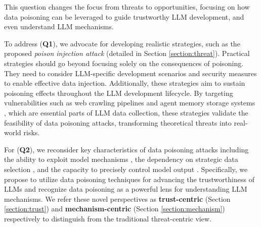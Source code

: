 This question changes the focus from threats to opportunities, focusing on how data poisoning can be leveraged to guide trustworthy LLM development, and even understand LLM mechanisms.


To address (\textbf{Q1}), we advocate 
for 
developing realistic strategies, such as the proposed \textit{poison injection attack} (detailed in Section \ref{section:threat}).
Practical strategies should go beyond focusing solely on the consequences of poisoning. They need to consider LLM-specific development scenarios and security measures to enable effective data injection. Additionally, these strategies aim to sustain poisoning effects throughout the LLM development lifecycle. By targeting vulnerabilities such as web crawling pipelines \citep{carlini2024poisoning} and agent memory storage systems \citep{chen2024agentpoison}, which are essential parts of LLM data collection, these strategies validate the feasibility of data poisoning attacks, transforming theoretical threats into real-world risks. 

For (\textbf{Q2}), we reconsider key characteristics of data poisoning attacks including the ability to exploit model mechanisms \citep{steinhardt2017certified, yu2022availability, he2024datapoisoningincontextlearning}, the dependency on strategic data selection \citep{hestealthy, xia2022data, zhu2023boosting}, and the capacity to precisely control model output \citep{schwarzschild2021just, shafahi2018poison, geiping2020witches}.
Specifically, we propose to utilize data poisoning techniques for advancing the trustworthiness of LLMs and recognize data poisoning as a powerful lens for understanding LLM mechanisms. We refer these novel perspectives as \textbf{trust-centric} (Section \ref{section:trust}) and \textbf{mechanism-centric} (Section \ref{section:mechanism}) respectively to distinguish from the traditional threat-centric view.

